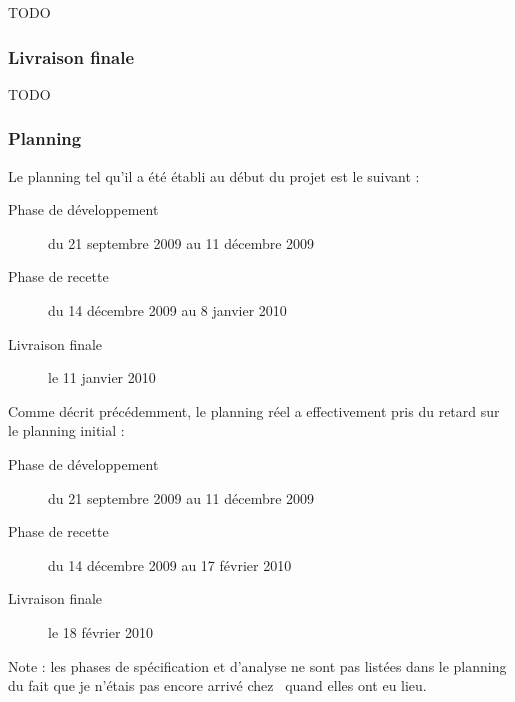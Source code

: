 TODO


\subsubsection{Livraison finale}

TODO


\subsubsection{Planning}

Le planning tel qu'il a été établi au début du projet est le suivant :

\begin{description}
	\item[Phase de développement] du 21 septembre 2009 au 11 décembre 2009
	\item[Phase de recette] du 14 décembre 2009 au 8 janvier 2010
	\item[Livraison finale] le 11 janvier 2010
\end{description}

Comme décrit précédemment, le planning réel a effectivement pris du retard sur le planning initial :

\begin{description}
	\item[Phase de développement] du 21 septembre 2009 au 11 décembre 2009
	\item[Phase de recette] du 14 décembre 2009 au 17 février 2010
	\item[Livraison finale] le 18 février 2010
\end{description}

Note : les phases de spécification et d'analyse ne sont pas listées dans le planning du fait que je n'étais pas encore arrivé chez \asl\ quand elles ont eu lieu.
